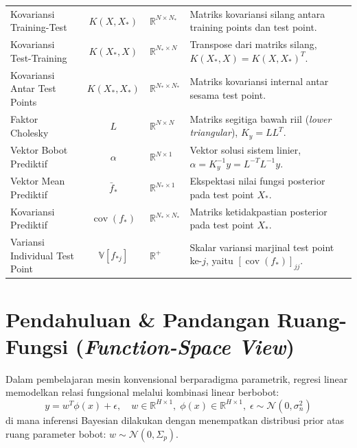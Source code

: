 \documentclass[11pt,a4paper]{article}
\def\boldsymbol#1{#1}%
\def\mathbf#1{#1}%
\begin{document}
\begin{table}[h!]
\begin{tabularx}{\textwidth}{l c l X}
Kovariansi Training-Test & $K(X, X_*)$ & $\mathbb{R}^{N \times N_*}$ & Matriks kovariansi silang antara training points dan test point. \\
Kovariansi Test-Training & $K(X_*, X)$ & $\mathbb{R}^{N_* \times N}$ & Transpose dari matriks silang, $K(X_*, X) = K(X, X_*)^T$. \\
Kovariansi Antar Test Points & $K(X_*, X_*)$ & $\mathbb{R}^{N_* \times N_*}$ & Matriks kovariansi internal antar sesama test point. \\
\midrule
Faktor Cholesky & $L$ & $\mathbb{R}^{N \times N}$ & Matriks segitiga bawah riil (\textit{lower triangular}), $K_y = L L^T$. \\
Vektor Bobot Prediktif & $\boldsymbol{\alpha}$ & $\mathbb{R}^{N \times 1}$ & Vektor solusi sistem linier, $\boldsymbol{\alpha} = K_y^{-1} \mathbf{y} = L^{-T} L^{-1} \mathbf{y}$. \\
Vektor Mean Prediktif & $\bar{\mathbf{f}}_*$ & $\mathbb{R}^{N_* \times 1}$ & Ekspektasi nilai fungsi posterior pada test point $X_*$. \\
Kovariansi Prediktif & $\operatorname{cov}(\mathbf{f}_*)$ & $\mathbb{R}^{N_* \times N_*}$ & Matriks ketidakpastian posterior pada test point $X_*$. \\
Variansi Individual Test Point & $\mathbb{V}[f_{*j}]$ & $\mathbb{R}^+$ & Skalar variansi marjinal test point ke-$j$, yaitu $[\operatorname{cov}(\mathbf{f}_*)]_{jj}$. \\
\bottomrule
\end{tabularx}
\end{table}

\section{Pendahuluan \& Pandangan Ruang-Fungsi (\textit{Function-Space View})}
\label{sec:filosofi}

Dalam pembelajaran mesin konvensional berparadigma parametrik, regresi linear memodelkan relasi fungsional melalui kombinasi linear berbobot:
\begin{equation}
y = \mathbf{w}^T \boldsymbol{\phi}(\mathbf{x}) + \epsilon, \quad \mathbf{w} \in \mathbb{R}^{H \times 1}, \; \boldsymbol{\phi}(\mathbf{x}) \in \mathbb{R}^{H \times 1}, \; \epsilon \sim \mathcal{N}(0, \sigma_n^2)
\end{equation}
di mana inferensi Bayesian dilakukan dengan menempatkan distribusi prior atas ruang parameter bobot: $\mathbf{w} \sim \mathcal{N}(\mathbf{0}, \Sigma_p)$.
\end{document}
